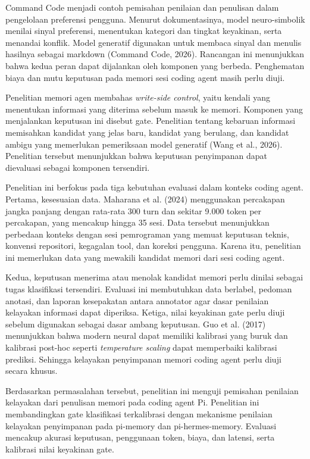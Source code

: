 \documentclass[
]{article}
\begin{document}
Command Code menjadi contoh pemisahan penilaian dan penulisan dalam pengelolaan preferensi pengguna. Menurut dokumentasinya, model neuro-simbolik menilai sinyal preferensi, menentukan kategori dan tingkat keyakinan, serta menandai konflik. Model generatif digunakan untuk membaca sinyal dan menulis hasilnya sebagai markdown (Command Code, 2026). Rancangan ini menunjukkan bahwa kedua peran dapat dijalankan oleh komponen yang berbeda. Penghematan biaya dan mutu keputusan pada memori sesi coding agent masih perlu diuji.

Penelitian memori agen membahas \emph{write-side control}, yaitu kendali yang menentukan informasi yang diterima sebelum masuk ke memori. Komponen yang menjalankan keputusan ini disebut gate. Penelitian tentang kebaruan informasi memisahkan kandidat yang jelas baru, kandidat yang berulang, dan kandidat ambigu yang memerlukan pemeriksaan model generatif (Wang et al., 2026). Penelitian tersebut menunjukkan bahwa keputusan penyimpanan dapat dievaluasi sebagai komponen tersendiri.

Penelitian ini berfokus pada tiga kebutuhan evaluasi dalam konteks coding agent. Pertama, kesesuaian data. Maharana et al. (2024) menggunakan percakapan jangka panjang dengan rata-rata 300 turn dan sekitar 9.000 token per percakapan, yang mencakup hingga 35 sesi. Data tersebut menunjukkan perbedaan konteks dengan sesi pemrograman yang memuat keputusan teknis, konvensi repositori, kegagalan tool, dan koreksi pengguna. Karena itu, penelitian ini memerlukan data yang mewakili kandidat memori dari sesi coding agent.

Kedua, keputusan menerima atau menolak kandidat memori perlu dinilai sebagai tugas klasifikasi tersendiri. Evaluasi ini membutuhkan data berlabel, pedoman anotasi, dan laporan kesepakatan antara annotator agar dasar penilaian kelayakan informasi dapat diperiksa. Ketiga, nilai keyakinan gate perlu diuji sebelum digunakan sebagai dasar ambang keputusan. Guo et al. (2017) menunjukkan bahwa modern neural dapat memiliki kalibrasi yang buruk dan kalibrasi post-hoc seperti \emph{temperature scaling} dapat memperbaiki kalibrasi prediksi. Sehingga kelayakan penyimpanan memori coding agent perlu diuji secara khusus.

Berdasarkan permasalahan tersebut, penelitian ini menguji pemisahan penilaian kelayakan dari penulisan memori pada coding agent Pi. Penelitian ini membandingkan gate klasifikasi terkalibrasi dengan mekanisme penilaian kelayakan penyimpanan pada pi-memory dan pi-hermes-memory. Evaluasi mencakup akurasi keputusan, penggunaan token, biaya, dan latensi, serta kalibrasi nilai keyakinan gate.
\end{document}
